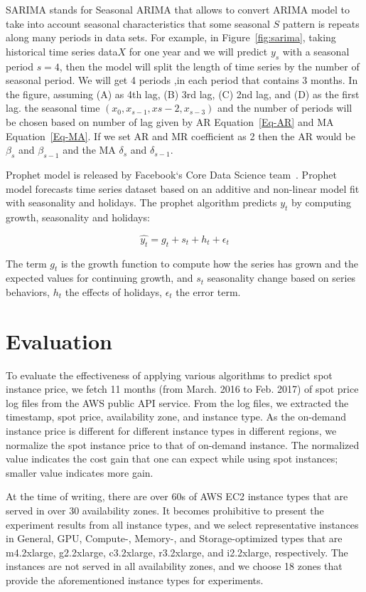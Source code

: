 \documentclass[graybox]{svmult}
\begin{document}
SARIMA stands for Seasonal ARIMA that allows to convert ARIMA model to take into account seasonal characteristics that some seasonal \(S\) pattern is repeats along many periods in data sets. For example, in Figure~\ref{fig:sarima}, taking historical time series data\(X\) for one year and we will predict \(y_s\) with a seasonal period \(s= 4\), then the model will split the length of time series by the number of seasonal period. We will get 4 periods ,in each period that contains 3 months. In the figure, assuming (A) as 4th lag, (B) 3rd lag, (C) 2nd lag, and (D) as the first lag. the seasonal time \( (x_{0}, x_{{s-1}}, x{{s-2}}, x_{{s-3}} )\) and the number of periods will be chosen based on number of lag given by AR Equation~\ref{Eq-AR} and MA Equation~\ref{Eq-MA}. If we set AR and MR coefficient as 2 then the AR would be\(\beta_{s}\) and \(\beta_{s-1}\) and the MA \(\delta_{s}\) and \(\delta_{s-1}\).

Prophet model is released by Facebook`s Core Data Science team~\cite{prophet}. Prophet model forecasts time series dataset based on an additive and non-linear model fit with seasonality and holidays. The prophet algorithm predicts \(y_t\) by computing growth, seasonality and holidays:

\begin{equation}
\hat{y_t} = g_t + s_t +h_t+\epsilon_t
\label{Eq-prophet}
\end{equation}

The term \(g_t\) is the growth function to compute how the series has grown and the expected values for continuing growth, and \(s_t\) seasonality change based on series behaviors, \(h_t\) the effects of holidays, \(\epsilon_t\) the error term.

\section{Evaluation}
To evaluate the effectiveness of applying various algorithms to predict spot instance price, we fetch 11 months (from March. 2016 to Feb. 2017) of spot price log files from the AWS public API service. From the log files, we extracted the timestamp, spot price, availability zone, and instance type. As the on-demand instance price is different for different instance types in different regions, we normalize the spot instance price to that of on-demand instance. The normalized value indicates the cost gain that one can expect while using spot instances; smaller value indicates more gain.

At the time of writing, there are over 60s of AWS EC2 instance types that are served in over 30 availability zones. It becomes prohibitive to present the experiment results from all instance types, and we select representative instances in General, GPU, Compute-, Memory-, and Storage-optimized types that are m4.2xlarge, g2.2xlarge, c3.2xlarge, r3.2xlarge, and i2.2xlarge, respectively. The instances are not served in all availability zones, and we choose 18 zones that provide the aforementioned instance types for experiments.
\end{document}
